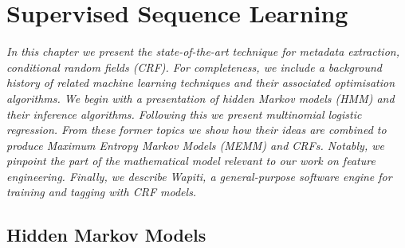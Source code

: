 
\chapter{Supervised Sequence Learning} %

\label{Chapter2} %



\emph{In this chapter we present the state-of-the-art technique for metadata extraction, conditional random fields (CRF). For completeness, we include a background history of related machine learning techniques and their associated optimisation algorithms. We begin with a presentation of hidden Markov models (HMM) and their inference algorithms. Following this we present multinomial logistic regression. From these former topics we show how their ideas are combined to produce Maximum Entropy Markov Models (MEMM) and CRFs. Notably, we pinpoint the part of the mathematical model relevant to our work on feature engineering. Finally, we describe Wapiti, a general-purpose software engine for training and tagging with CRF models.}

\section{Hidden Markov Models}

